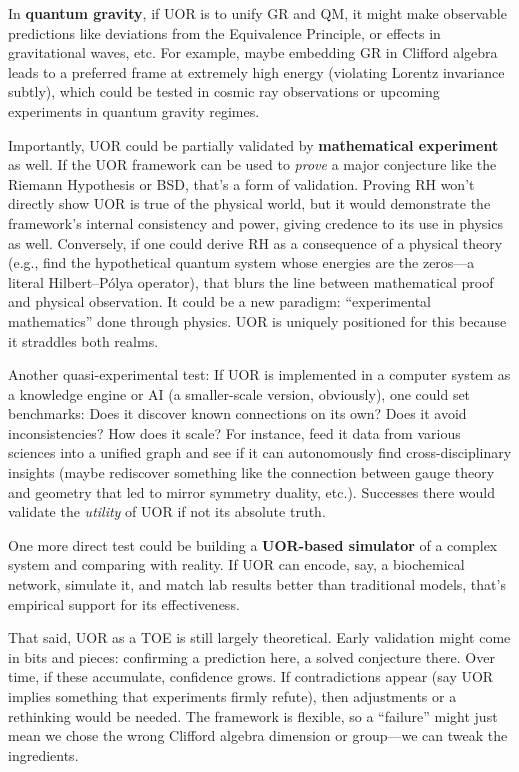 \documentclass[12pt]{article}
\begin{document}
\medskip

In \textbf{quantum gravity}, if UOR is to unify GR and QM, it might make observable predictions like deviations from the Equivalence Principle, or effects in gravitational waves, etc. For example, maybe embedding GR in Clifford algebra leads to a preferred frame at extremely high energy (violating Lorentz invariance subtly), which could be tested in cosmic ray observations or upcoming experiments in quantum gravity regimes.

\medskip

Importantly, UOR could be partially validated by \textbf{mathematical experiment} as well. If the UOR framework can be used to \emph{prove} a major conjecture like the Riemann Hypothesis or BSD, that’s a form of validation. Proving RH won’t directly show UOR is true of the physical world, but it would demonstrate the framework’s internal consistency and power, giving credence to its use in physics as well. Conversely, if one could derive RH as a consequence of a physical theory (e.g., find the hypothetical quantum system whose energies are the zeros---a literal Hilbert--P\'olya operator), that blurs the line between mathematical proof and physical observation. It could be a new paradigm: ``experimental mathematics'' done through physics. UOR is uniquely positioned for this because it straddles both realms.

\medskip

Another quasi-experimental test: If UOR is implemented in a computer system as a knowledge engine or AI (a smaller-scale version, obviously), one could set benchmarks: Does it discover known connections on its own? Does it avoid inconsistencies? How does it scale? For instance, feed it data from various sciences into a unified graph and see if it can autonomously find cross-disciplinary insights (maybe rediscover something like the connection between gauge theory and geometry that led to mirror symmetry duality, etc.). Successes there would validate the \emph{utility} of UOR if not its absolute truth.

\medskip

One more direct test could be building a \textbf{UOR-based simulator} of a complex system and comparing with reality. If UOR can encode, say, a biochemical network, simulate it, and match lab results better than traditional models, that’s empirical support for its effectiveness.

\medskip

That said, UOR as a TOE is still largely theoretical. Early validation might come in bits and pieces: confirming a prediction here, a solved conjecture there. Over time, if these accumulate, confidence grows. If contradictions appear (say UOR implies something that experiments firmly refute), then adjustments or a rethinking would be needed. The framework is flexible, so a ``failure'' might just mean we chose the wrong Clifford algebra dimension or group---we can tweak the ingredients.
\end{document}

